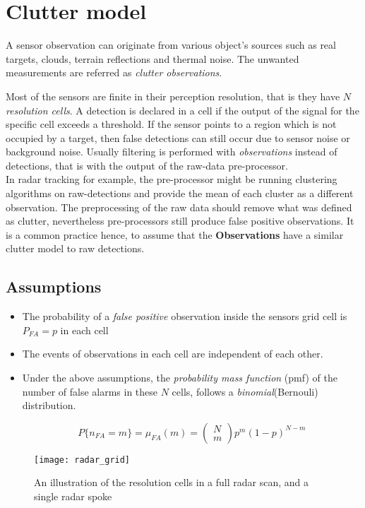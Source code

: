 \section{Clutter model}
A sensor observation can originate from various object's sources such as real targets, clouds, terrain reflections and thermal noise. The unwanted measurements are referred as \emph{clutter observations}\cite{Memon2020}.


Most of the sensors are finite in their perception resolution, that is they have $N$  \emph{resolution cells}. A detection is declared in a cell if  the output of the signal for the specific cell exceeds a threshold. If the sensor points to a region which is not occupied by a target, then false detections can still occur  due to sensor noise or background noise. Usually filtering is performed with \emph{observations} instead of detections, that is with the output of the raw-data pre-processor.\\

In radar tracking for example, the pre-processor might be running clustering algorithms on raw-detections and provide the mean of each cluster as a different observation. The preprocessing of the raw data should remove what was defined as clutter, nevertheless pre-processors still produce false positive observations. It is a common practice hence, to assume that the \textbf{Observations} have a similar clutter model to raw detections.

\subsection{Assumptions}

\begin{itemize}
	\item The probability of a \emph{false positive} observation inside the sensors grid cell is $P_{FA} = p$ in each cell
	\item The events of observations in each cell are independent of each other.
	\item 
	Under the above assumptions, the \emph{probability mass function} (pmf) of the number of false alarms in these $N$ cells, follows a \emph{binomial}(Bernouli) distribution.
	
	$$
	P\{n_{FA}=m\} = \mu_{FA}(m) = \begin{pmatrix}N \\m \end{pmatrix} p^m (1-p)^{N-m}
	$$
\end{itemize}
\begin{figure}[H]
	\centering
	\texttt{[image: radar\_grid]}
	\caption{An illustration of the resolution cells in a full radar scan, and a single radar spoke\cite{Wilthil2017}}
	\label{fig:radargrid}
\end{figure}

